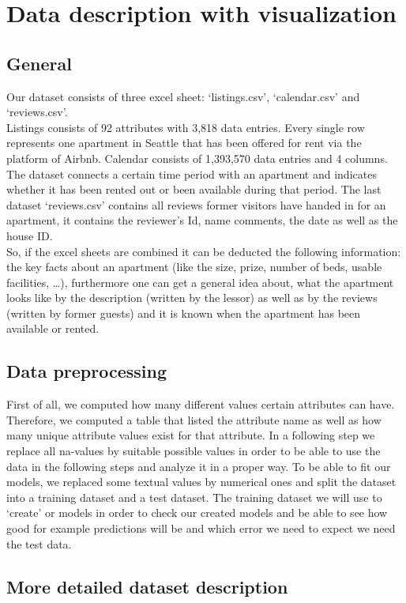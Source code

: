 \section{Data description with visualization}


\subsection {General}
Our dataset consists of three excel sheet: ‘listings.csv’, ‘calendar.csv’ and ‘reviews.csv’.\\
Listings consists of 92 attributes with 3,818 data entries. Every single row represents one apartment in Seattle that has been offered for rent via the platform of Airbnb. Calendar consists of 1,393,570 data entries and 4 columns. The dataset connects a certain time period with an apartment and indicates whether it has been rented out or been available during that period. The last dataset ‘reviews.csv’ contains all reviews former visitors have handed in for an apartment, it contains the reviewer’s Id, name comments, the date as well as the house ID.\\So, if the excel sheets are combined it can be deducted the following information: the key facts about an apartment (like the size, prize, number of beds, usable facilities, …), furthermore one can get a general idea about, what the apartment looks like by the description (written by the lessor) as well as by the reviews (written by former guests) and it is known when the apartment has been available or rented.

\subsection {Data preprocessing}

First of all, we computed how many different values certain attributes can have. Therefore, we computed a table that listed the attribute name as well as how many unique attribute values exist for that attribute.
In a following step we replace all na-values by suitable possible values in order to be able to use the data in the following steps and analyze it in a proper way. To be able to fit our models, we replaced some textual values by numerical ones and split the dataset into a training dataset and a test dataset. The training dataset we will use to ‘create’ or models in order to check our created models and be able to see how good for example predictions will be and which error we need to expect we need the test data.
\subsection {More detailed dataset description}
